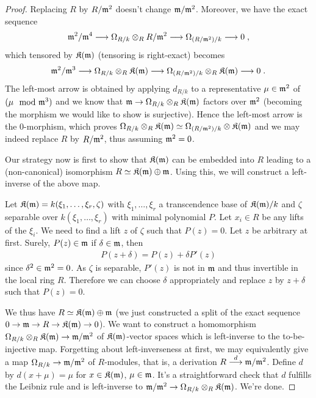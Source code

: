 \documentclass[a4paper,parskip=half,numbers=enddot, DIV=12]{scrreprt}
\begin{document}
\begin{proof}
	Replacing $R$ by $R/\mathfrak{m}^2$ doesn't change $\mathfrak{m}/\mathfrak{m}^2$. Moreover, we have the exact sequence
	\begin{align*}
		\mm^2/\mm^4\morphism\Omega_{R/k}\otimes_R R/\mm^2\morphism\Omega_{(R/\mm^2)/k}\morphism 0\;,
	\end{align*}
	which tensored by $\mathfrak{K}(\mathfrak{m})$ (tensoring is right-exact) becomes
	\begin{align*}
		\mm^2/\mm^3\morphism\Omega_{R/k}\otimes_R \KK(\mm)\morphism\Omega_{(R/\mm^2)/k}\otimes_R\KK(\mm)\morphism 0\;.
	\end{align*}
	The left-most arrow is obtained by applying $d_{R/k}$ to a representative $\mu\in\mathfrak{m}^2$ of $(\mu\mod{\mathfrak{m}}^3)$ and we know that $\mm\morphism\Omega_{R/k}\otimes_R\KK(\mm)$ factors over $\mathfrak{m}^2$ (becoming the morphism we would like to show is surjective). Hence the left-most arrow is the $0$-morphism, which proves $\Omega_{R/k}\otimes_R \mathfrak{K}(\mathfrak{m})\simeq\Omega_{(R/\mathfrak{m}^2)/k}\otimes\mathfrak{K}(\mathfrak{m})$ and we may indeed replace $R$ by $R/\mathfrak{m}^2$, thus assuming $\mathfrak{m}^2=0$.
	
	Our strategy now is first to show that $\mathfrak{K}(\mathfrak{m})$ can be embedded into $R$ leading to a (non-canonical) isomorphism $R\simeq\mathfrak{K}(\mathfrak{m})\oplus\mathfrak{m}$. Using this, we will construct a left-inverse of the above map.
	
	Let $\mathfrak{K}(\mathfrak{m})=k(\xi_1,\ldots,\xi_r,\zeta)$ with $\xi_1,\ldots,\xi_r$ a transcendence base of $\mathfrak{K}(\mathfrak{m})/k$ and $\zeta$ separable over $k(\xi_1,\ldots,\xi_r)$ with minimal polynomial $P$. Let $x_i\in R$ be any lifts of the $\xi_i$. We need to find a lift $z$ of $\zeta$ such that $P(z)=0$. Let $z$ be arbitrary at first. Surely, $P(z)\in\mathfrak{m}$ if $\delta\in\mathfrak{m}$, then
	\begin{align*}
		P(z+\delta)=P(z)+\delta P'(z)
	\end{align*}
	since $\delta^2\in\mathfrak{m}^2=0$. As $\zeta$ is separable, $P'(z)$ is not in $\mathfrak{m}$ and thus invertible in the local ring $R$. Therefore we can choose $\delta$ appropriately and replace $z$ by $z+\delta$ such that $P(z)=0$.
	
	We thus have $R\simeq \mathfrak{K}(\mathfrak{m})\oplus\mathfrak{m}$ (we just constructed a split of the exact sequence $0\morphism \mm\morphism R\morphism\KK(\mm)\morphism 0$). We want to construct a homomorphism $\Omega_{R/k}\otimes_R\KK(\mm)\morphism\mm/\mm^2$ of $\mathfrak{K}(\mathfrak{m})$-vector spaces which is left-inverse to the to-be-injective map. Forgetting about left-inverseness at first, we may equivalently give a map $\Omega_{R/k}\morphism\mm/\mm^2$ of $R$-modules, that is, a derivation $R\morphism[d]\mm/\mm^2$. Define $d$ by $d(x+\mu)=\mu$ for $x\in\mathfrak{K}(\mathfrak{m})$, $\mu\in\mathfrak{m}$. It's a straightforward check that $d$ fulfills the Leibniz rule and is left-inverse to $\mm/\mm^2\morphism\Omega_{R/k}\otimes_R\KK(\mm)$. We're done.
\end{proof}
\end{document}

